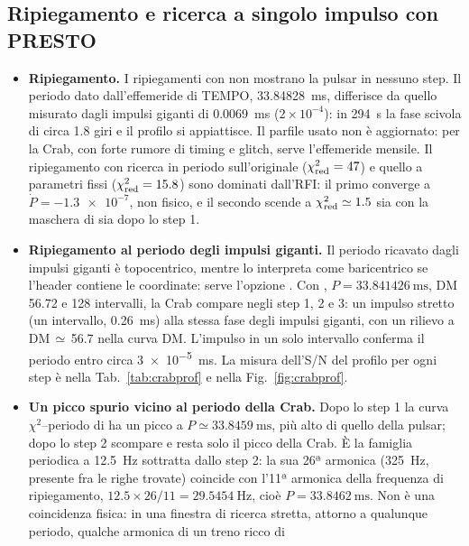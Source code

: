 \subsection{Ripiegamento e ricerca a singolo impulso con PRESTO}
\sloppy
\begin{itemize}
  \item \textbf{Ripiegamento.} I ripiegamenti con  non mostrano la pulsar in nessuno step.
    Il periodo dato dall'effemeride di TEMPO, \SI{33.84828}{\milli\second}, differisce da quello misurato dagli impulsi
    giganti di \SI{0.0069}{\milli\second} ($2\times10^{-4}$): in \SI{294}{\second} la fase scivola di circa 1.8 giri e
    il profilo si appiattisce. Il parfile usato non è aggiornato: per la Crab, con forte rumore di timing e glitch,
    serve l'effemeride mensile. Il ripiegamento con ricerca in periodo sull'originale ($\chi^2_{\rm red}=47$) e quello a
    parametri fissi ($\chi^2_{\rm red}=15.8$) sono dominati dall'RFI: il primo converge a
    $\dot P=\num{-1.3e-7}$, non fisico, e il secondo scende a $\chi^2_{\rm red}\simeq1.5$ sia con la maschera di
     sia dopo lo step 1.
  \item \textbf{Ripiegamento al periodo degli impulsi giganti.} Il periodo ricavato dagli impulsi giganti è
    topocentrico, mentre  lo interpreta come baricentrico se l'header contiene le coordinate: serve
    l'opzione . Con , $P=\SI{33.841426}{\milli\second}$, DM 56.72 e 128 intervalli,
    la Crab compare negli step 1, 2 e 3: un impulso stretto (un intervallo, \SI{0.26}{\milli\second}) alla stessa fase
    degli impulsi giganti, con un rilievo a DM\,$\simeq$\,56.7 nella curva DM. L'impulso in un solo intervallo
    conferma il periodo entro circa \SI{3e-5}{\milli\second}. La misura dell'S/N del profilo per ogni step è nella
    Tab.~\ref{tab:crabprof} e nella Fig.~\ref{fig:crabprof}.
  \item \textbf{Un picco spurio vicino al periodo della Crab.} Dopo lo step 1 la curva $\chi^2$--periodo di
     ha un picco a $P\simeq\SI{33.8459}{\milli\second}$, più alto di quello della pulsar; dopo lo step 2
    scompare e resta solo il picco della Crab. È la famiglia periodica a \SI{12.5}{\hertz} sottratta dallo step 2: la
    sua 26ª armonica (\SI{325}{\hertz}, presente fra le righe trovate) coincide con l'11ª armonica della frequenza di
    ripiegamento, $12.5\times26/11=\SI{29.5454}{\hertz}$, cioè $P=\SI{33.8462}{\milli\second}$. Non è una coincidenza
    fisica: in una finestra di ricerca stretta, attorno a qualunque periodo, qualche armonica di un treno ricco di

\end{itemize}
